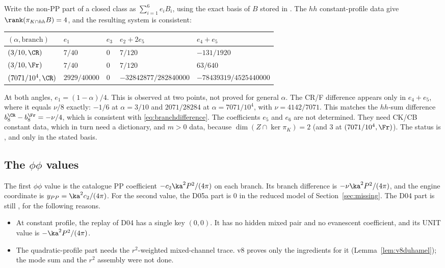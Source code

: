Write the non-PP part of a closed class as \(\sum_{i=1}^6e_iB_i\),
using the exact basis of \(B\) stored in
.
The \(hh\) constant-profile data give
\(\rank(\pi_{K\cap hh}B)=4\), and the resulting system is consistent:
\begin{center}
\small
\begin{tabular}{@{}lllll@{}}
\toprule
\((\alpha,\text{branch})\) & \(e_1\) & \(e_3\) & \(e_2+2e_5\) & \(e_4+e_5\)\\
\midrule
\((3/10,\CR)\) & \(7/40\) & \(0\) & \(7/120\) & \(-131/1920\)\\
\((3/10,\Fr)\) & \(7/40\) & \(0\) & \(7/120\) & \(63/640\)\\
\((7071/10^4,\CR)\) & \(2929/40000\) & \(0\) &
\(-32842877/282840000\) & \(-78439319/4525440000\)\\
\bottomrule
\end{tabular}
\end{center}
At both angles, \(e_1=(1-\alpha)/4\). This is observed at two
points, not proved for general \(\alpha\).
The CR/F difference appears only in \(e_4+e_5\), where it equals
\(\nu/8\) exactly: \(-1/6\) at \(\alpha=3/10\) and \(2071/28284\) at
\(\alpha=7071/10^4\), with \(\nu=4142/7071\).
This matches the \(hh\)-sum difference
\(b_8^{\CR}-b_8^{\Fr}=-\nu/4\), which is consistent with
\eqref{eq:branchdifference}.
The coefficients \(e_5\) and \(e_6\) are not determined. They need
CK/CB constant data, which in turn need a dictionary, and
\(m>0\) data, because \(\dim(Z\cap\ker\pi_K)=2\) (and \(3\) at
\((7071/10^4,\Fr)\)).
The status is \PARTIAL, and only in the stated basis.

\subsection{The \texorpdfstring{\(\phi\phi\)}{phi phi} values}

The first \(\phi\phi\) value is the catalogue PP coefficient
\(-c_2\ka^2P^2/(4\pi)\) on each branch. Its branch difference is
\(-\nu\ka^2P^2/(4\pi)\), and the engine coordinate is
\(y_{PP}=\ka^2c_2/(4\pi)\).
For the second value, the D05a part is \(0\) in the reduced model
of Section~\ref{sec:missing}.
The D04 part is still \OPEN, for the following reasons.
\begin{itemize}
\item At constant profile, the replay of D04 has a single key
\((0,0)\). It has no hidden mixed pair and no evanescent
coefficient, and its UNIT value is \(-\ka^2P^2/(4\pi)\).
\item The quadratic-profile part needs the \(r^2\)-weighted
mixed-channel trace. v8 proves only the ingredients for it
(Lemma~\ref{lem:v8duhamel}); the mode sum and the \(r^2\)
assembly were not done.
\end{itemize}
